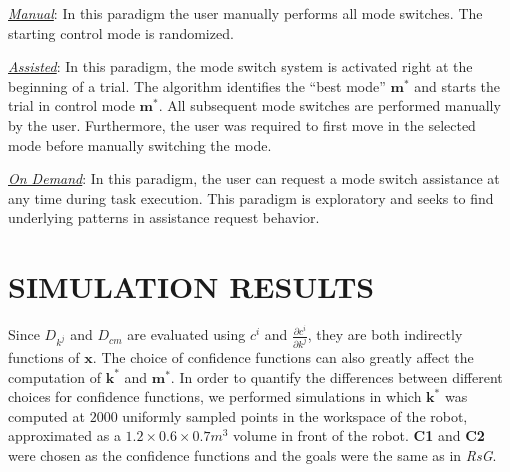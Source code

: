 \documentclass[conference]{IEEEtran}
\begin{document}
\noindent\underline{\textit{Manual}}: In this paradigm the user manually performs all mode switches. The starting control mode is randomized. 

\noindent\underline{\textit{Assisted}}: In this paradigm, the mode switch system is activated right at the beginning of a trial. The algorithm identifies the ``best mode'' $\boldsymbol{m}^*$ and starts the trial in control mode $\boldsymbol{m}^*$. All subsequent mode switches are performed manually by the user. Furthermore, the user was required to first move in the selected mode before manually switching the mode. 

\noindent\underline{\textit{On Demand}}: In this paradigm, the user can request a mode switch assistance at any time during task execution. This paradigm is exploratory and seeks to find underlying patterns in assistance request behavior. 
\section{SIMULATION RESULTS} \label{SIMRESULTS}

 Since $D_{k^j}$ and $D_{cm}$ are evaluated using $c^i$ and $\frac{\partial c^i}{\partial k^j}$, they are both indirectly functions of $\boldsymbol{x}$. The choice of confidence functions can also greatly affect the computation of $\boldsymbol{k}^*$ and $\boldsymbol{m}^*$. In order to quantify the differences between different choices for confidence functions, we performed simulations in which $\boldsymbol{k}^*$ was computed at $2000$ uniformly sampled points in the workspace of the robot, approximated as a $1.2\times0.6\times0.7 m^3$ volume in front of the robot. \textbf{C1} and \textbf{C2} were chosen as the confidence functions and the goals were the same as in \textit{RsG}. 
\end{document}
